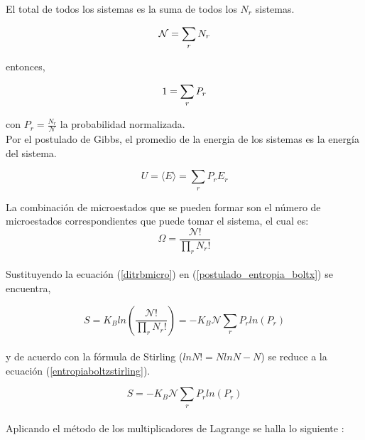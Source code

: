 El total de todos los sistemas es la suma de todos los $N_r$ sistemas.

\begin{equation} \label{conteoprob}
    \mathcal{N} = \sum_r N_r \\
\end{equation}

entonces,

\begin{equation} \label{restrprob}
    1 = \sum_r P_r \\
\end{equation}

con $P_r = \frac{N_r}{\mathcal{N}}$ la probabilidad normalizada.\\

Por el postulado de Gibbs, el promedio de la energia de los sistemas es la energía del sistema.

\begin{equation} \label{energiaprob}
    U = \langle E\rangle = \sum_r P_r E_r
\end{equation}

La combinación de microestados que se pueden formar son el número de microestados correspondientes que puede tomar el sistema, el cual es:\\

\begin{equation} \label{ditrbmicro}
    \Omega = \frac{\mathcal{N}!}{\prod_r N_r!}
\end{equation}\\

Sustituyendo la ecuación (\ref{ditrbmicro}) en (\ref{postulado_entropia_boltx}) se encuentra,

\begin{equation}  \label{entropiaboltz}
    S = K_{B}ln\left(\frac{\mathcal{N}!}{\prod_r N_r!}\right) = -K_{B}\mathcal{N}\sum_r P_rln(P_r)
\end{equation}\\

y de acuerdo con la fórmula de Stirling ($lnN!=NlnN-N$) se reduce a la ecuación (\ref{entropiaboltzstirling}).

\begin{equation}  \label{entropiaboltzstirling}
    S = -K_{B}\mathcal{N}\sum_r P_rln(P_r)
\end{equation}\\

Aplicando el método de los multiplicadores de Lagrange se halla lo siguiente \cite{greiner1995}:


